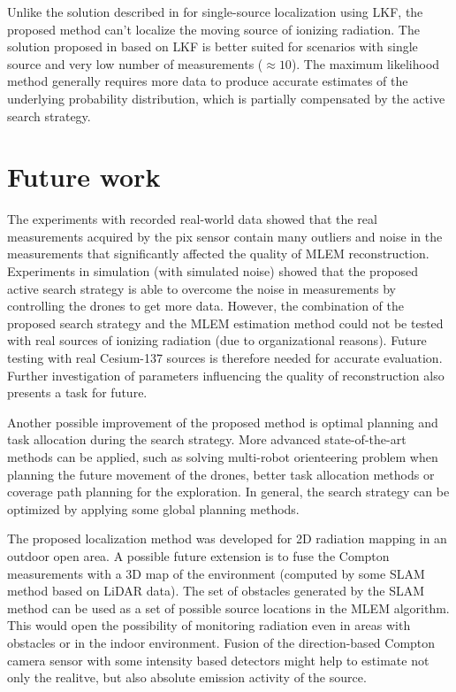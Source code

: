 Unlike the solution described in \cite{baca2021gamma} for single-source localization using \ac{LKF}, the proposed method can't localize the moving source of ionizing radiation.
The solution proposed in \cite{baca2021gamma} based on \ac{LKF} is better suited for scenarios with single source and very low number of measurements ($\approx 10$).
The maximum likelihood method generally requires more data to produce accurate estimates of the underlying probability distribution, which is partially compensated by the active search strategy.

\section{Future work}
The experiments with recorded real-world data showed that the real measurements acquired by the \ac{pix} sensor contain many outliers and noise in the measurements that significantly affected the quality of \ac{MLEM} reconstruction.
Experiments in simulation (with simulated noise) showed that the proposed active search strategy is able to overcome the noise in measurements by controlling the drones to get more data.
However, the combination of the proposed search strategy and the \ac{MLEM} estimation method could not be tested with real sources of ionizing radiation (due to organizational reasons).
Future testing with real Cesium-137 sources is therefore needed for accurate evaluation.
Further investigation of parameters influencing the quality of reconstruction also presents a task for future.

Another possible improvement of the proposed method is optimal planning and task allocation during the search strategy.
More advanced state-of-the-art methods can be applied, such as solving multi-robot orienteering problem when planning the future movement of the drones, better task allocation methods or coverage path planning for the exploration.
In general, the search strategy can be optimized by applying some global planning methods.

The proposed localization method was developed for 2D radiation mapping in an outdoor open area.
A possible future extension is to fuse the Compton measurements with a 3D map of the environment (computed by some \ac{SLAM} method based on \ac{LiDAR} data).
The set of obstacles generated by the \ac{SLAM} method can be used as a set of possible source locations in the \ac{MLEM} algorithm.
This would open the possibility of monitoring radiation even in areas with obstacles or in the indoor environment.
Fusion of the direction-based Compton camera sensor with some intensity based detectors might help to estimate not only the realitve, but also absolute emission activity of the source. 



